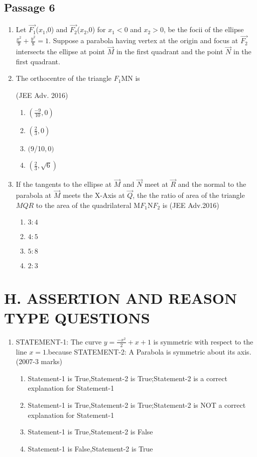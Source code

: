 \documentclass[journal]{IEEEtran}
\numberwithin{equation}{enumi}
\numberwithin{figure}{enumi}
\begin{document}
\subsection*{Passage 6}
\begin{enumerate}
\item[] Let $\vec{F_1}$($x_1$,0) and  $\vec{F_2}$($x_2$,0) for $x_1<0$ and $x_2>0$, be the focii of the ellipse $\frac{x^2}{9}+\frac{y^2}{8} =1$. Suppose a parabola having vertex at the origin and focus at $\vec{F_2}$ intersects the ellipse at point $\Vec{M}$ in the first quadrant and the point $\Vec{N}$ in the first quadrant.
\item The orthocentre of the triangle $F_1$MN is

         \hfill(JEE Adv. 2016)
\begin{enumerate}
     \item $(\frac{-9}{10},0)$   
     \item $(\frac{2}{3},0)$     
     \item $($9/10$,0)$ 
    \item $(\frac{2}{3},\sqrt{6})$ 
    \end{enumerate}
\item If the tangents to the ellipse at $\Vec{M}$ and $\Vec{N}$ meet at $\Vec{R}$ and the normal to the parabola at $\Vec{M}$ meets the X-Axis at $\Vec{Q}$, the the ratio of area of the triangle $MQR$ to the area of the quadrilateral M$F_1$N$F_2$ is
\hfill(JEE Adv.2016)
\begin{enumerate}
    \item $3:4$
    \item $4:5$
    \item $5:8$
    \item $2:3$
\end{enumerate}
\end{enumerate}
\section*{H. ASSERTION AND REASON TYPE QUESTIONS}
\begin{enumerate}
\item STATEMENT-1: The curve $y=\frac{-x^2}{2}+x+1$ is symmetric with respect to the line $x=1$.because
STATEMENT-2: A Parabola is symmetric about its axis.
\hfill(2007-3 marks)
\begin{enumerate}
    \item Statement-1 is True,Statement-2 is True;Statement-2 is a correct explanation for Statement-1\item  Statement-1 is True,Statement-2 is True;Statement-2 is NOT a correct explanation for Statement-1\item Statement-1 is True,Statement-2 is False\item Statement-1 is False,Statement-2 is True
\end{enumerate}
\end{enumerate}
\end{document}
